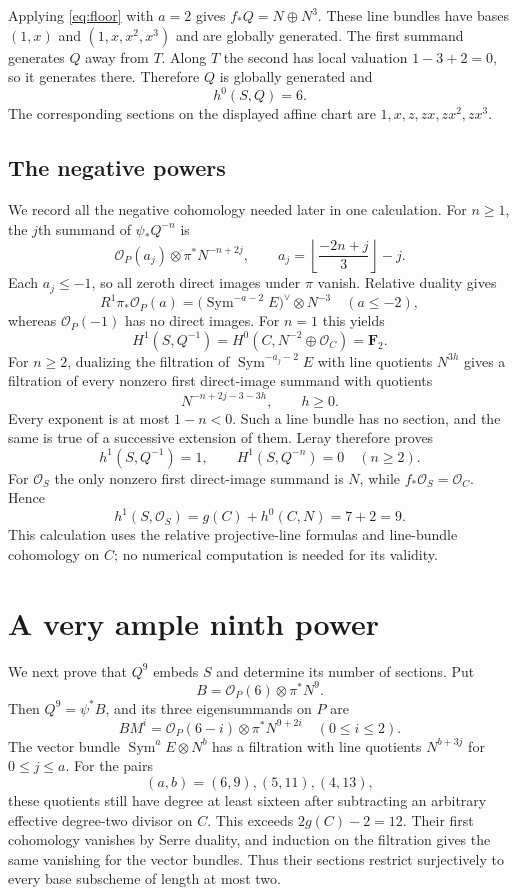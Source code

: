 \documentclass[11pt]{article}
\theoremstyle{remark}\newtheorem{remark}[theorem]{Remark}
\newcommand{\OO}{\mathcal O}
\newcommand{\F}{\mathbf F}
\newcommand{\Sym}{\operatorname{Sym}}
\begin{document}
Applying \eqref{eq:floor} with $a=2$ gives $f_*Q=N\oplus N^3$. These line bundles have bases $(1,x)$ and $(1,x,x^2,x^3)$ and are globally generated. The first summand generates $Q$ away from $T$. Along $T$ the second has local valuation $1-3+2=0$, so it generates there. Therefore $Q$ is globally generated and
\begin{equation}\label{eq:qsections}
 h^0(S,Q)=6.
\end{equation}
The corresponding sections on the displayed affine chart are $1,x,z,zx,zx^2,zx^3$.

\subsection{The negative powers}

We record all the negative cohomology needed later in one calculation. For $n\geq1$, the $j$th summand of $\psi_*Q^{-n}$ is
\[
 \OO_P(a_j)\otimes\pi^*N^{-n+2j},
 \qquad a_j=\left\lfloor\frac{-2n+j}{3}\right\rfloor-j.
\]
Each $a_j\leq-1$, so all zeroth direct images under $\pi$ vanish. Relative duality gives
\[
 R^1\pi_*\OO_P(a)=\bigl(\Sym^{-a-2}E\bigr)^\vee\otimes N^{-3}
 \quad(a\leq-2),
\]
whereas $\OO_P(-1)$ has no direct images. For $n=1$ this yields
\[
 H^1(S,Q^{-1})=H^0(C,N^{-2}\oplus\OO_C)=\F_2.
\]
For $n\geq2$, dualizing the filtration of $\Sym^{-a_j-2}E$ with line quotients $N^{3h}$ gives a filtration of every nonzero first direct-image summand with quotients
\[
 N^{-n+2j-3-3h},\qquad h\geq0.
\]
Every exponent is at most $1-n<0$. Such a line bundle has no section, and the same is true of a successive extension of them. Leray therefore proves
\begin{equation}\label{eq:negative}
 h^1(S,Q^{-1})=1,\qquad H^1(S,Q^{-n})=0\quad(n\geq2).
\end{equation}
For $\OO_S$ the only nonzero first direct-image summand is $N$, while $f_*\OO_S=\OO_C$. Hence
\begin{equation}\label{eq:irregularity}
 h^1(S,\OO_S)=g(C)+h^0(C,N)=7+2=9.
\end{equation}
This calculation uses the relative projective-line formulas and line-bundle cohomology on $C$; no numerical computation is needed for its validity.

\section{A very ample ninth power}

We next prove that $Q^9$ embeds $S$ and determine its number of sections. Put
\[
 B=\OO_P(6)\otimes\pi^*N^9.
\]
Then $Q^9=\psi^*B$, and its three eigensummands on $P$ are
\[
 BM^i=\OO_P(6-i)\otimes\pi^*N^{9+2i}\quad(0\leq i\leq2).
\]
The vector bundle $\Sym^aE\otimes N^b$ has a filtration with line quotients $N^{b+3j}$ for $0\leq j\leq a$. For the pairs
\[
 (a,b)=(6,9),(5,11),(4,13),
\]
these quotients still have degree at least sixteen after subtracting an arbitrary effective degree-two divisor on $C$. This exceeds $2g(C)-2=12$. Their first cohomology vanishes by Serre duality, and induction on the filtration gives the same vanishing for the vector bundles. Thus their sections restrict surjectively to every base subscheme of length at most two.
\end{document}
